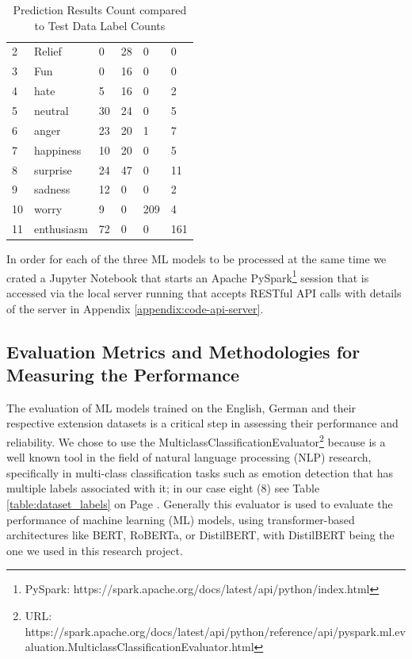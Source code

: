 \documentclass[11pt]{article}
\begin{document}
\begin{table}[h!]
\begin{tabular}{ | M | M | M | M | M | M | }
    2 & Relief      &  0 & 28 &   0 &   0 \\
    3 & Fun         &  0 & 16 &   0 &   0 \\
    4 & hate        &  5 & 16 &   0 &   2 \\
    5 & neutral     & 30 & 24 &   0 &   5 \\ 
    6 & anger       & 23 & 20 &   1 &   7 \\
    7 & happiness   & 10 & 20 &   0 &   5 \\
    8 & surprise    & 24 & 47 &   0 &  11 \\
    9 & sadness     & 12 &  0 &   0 &   2 \\
    10 & worry      &  9 &  0 & 209 &   4 \\
    11 & enthusiasm & 72 &  0 &   0 & 161 \\
    \hline
\end{tabular}
\caption{Prediction Results Count compared to Test Data Label Counts}
\label{table:ml-prediction-result-versus-test-data}
\end{table}

In order for each of the three ML models to be processed at the same time we crated a Jupyter Notebook that starts an Apache PySpark\footnote{PySpark: https://spark.apache.org/docs/latest/api/python/index.html} session that is accessed via the local server running that accepts RESTful API calls with details of the server in Appendix \ref{appendix:code-api-server}.

\subsection{Evaluation Metrics and Methodologies for Measuring the Performance}
\label{sec:evaluation-metrics-and-methodologies}
The evaluation of ML models trained on the English, German and their respective extension datasets is a critical step in assessing their performance and reliability. We chose to use the MulticlassClassificationEvaluator\footnote{URL: https://spark.apache.org/docs/latest/api/python/reference/api/pyspark.ml.evaluation.MulticlassClassificationEvaluator.html} because is a well known tool in the field of natural language processing (NLP) research, specifically in multi-class classification tasks such as emotion detection that has multiple labels associated with it; in our case eight (8) see Table \ref{table:dataset_labels} on Page \pageref{table:dataset_labels}. Generally this evaluator is used to evaluate the performance of machine learning (ML) models, using transformer-based architectures like BERT, RoBERTa, or DistilBERT\cite{Sanh2019-DistilBERT-AD}, with DistilBERT\cite{Sanh2019-DistilBERT-AD} being the one we used in this research project.
\end{document}
